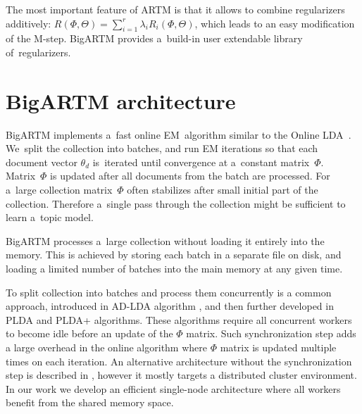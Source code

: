 \documentclass[russian,english]{llncs}
\begin{document}
The most important feature of ARTM is that it allows to combine regularizers additively:
$R(\Phi,\Theta) = \sum_{i=1}^r \lambda_i R_i(\Phi,\Theta)$,
which leads to an easy modification of the M-step.
BigARTM provides a~build-in user extendable library of~regularizers.

\section{BigARTM architecture}
\label{sec:BigARTM}

BigARTM implements a~fast online EM~algorithm
similar to the Online LDA~\cite{hoffman10online}.
We~split the collection into batches,
and run EM iterations so that
each document vector $\theta_d$ is~iterated until convergence at a~constant matrix~$\Phi$.
\mbox{Matrix}~$\Phi$ is updated after all documents from the batch are processed.
For a~large collection
matrix~$\Phi$ often stabilizes after small initial part of the collection.
Therefore a~single pass through the collection might be sufficient to learn a~topic model.

%

BigARTM processes a~large collection without loading it entirely into the memory.
This is achieved by storing each batch in a separate file on disk,
and loading a limited number of batches into the main memory at any given time.

To split collection into batches and process them concurrently is a common approach,
introduced in AD-LDA algorithm \cite{newman09distributed}, and
then further developed in PLDA \cite{wang09plda} and PLDA{+} \cite{liu11plda} algorithms.
These algorithms require all concurrent workers to become idle before an update of the $\Phi$ matrix.
Such synchronization step adds a large overhead in the online algorithm where $\Phi$ matrix is updated multiple times on each iteration.
An alternative architecture without the synchronization step is described in \cite{smola10architecture},
however it mostly targets a distributed cluster environment.
In our work we develop an efficient single-node architecture where all workers benefit from the shared memory space.
\end{document}
